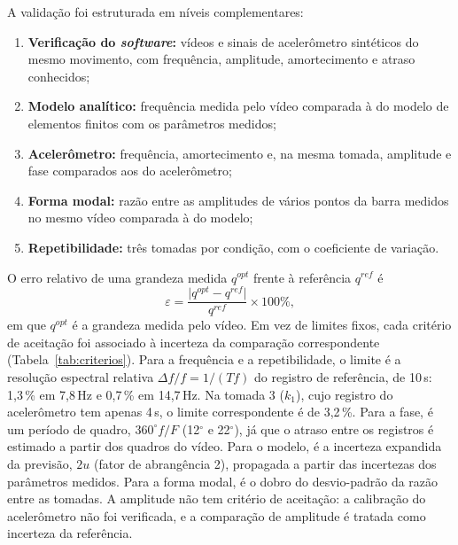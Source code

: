 \documentclass[a4paper,10pt,twocolumn]{article}
\begin{document}
A validação foi estruturada em níveis complementares:
\begin{enumerate}
    \item \textbf{Verificação do \textit{software}:} vídeos e sinais de acelerômetro sintéticos do mesmo movimento, com frequência, amplitude, amortecimento e atraso conhecidos;
    \item \textbf{Modelo analítico:} frequência medida pelo vídeo comparada à do modelo de elementos finitos com os parâmetros medidos;
    \item \textbf{Acelerômetro:} frequência, amortecimento e, na mesma tomada, amplitude e fase comparados aos do acelerômetro;
    \item \textbf{Forma modal:} razão entre as amplitudes de vários pontos da barra medidos no mesmo vídeo comparada à do modelo;
    \item \textbf{Repetibilidade:} três tomadas por condição, com o coeficiente de variação.
\end{enumerate}
O erro relativo de uma grandeza medida $q^{opt}$ frente à referência $q^{ref}$ é
\begin{equation}
    \varepsilon = \frac{\bigl|q^{opt} - q^{ref}\bigr|}{q^{ref}} \times 100\%,
    \label{eq:criterio_validacao}
\end{equation}
em que $q^{opt}$ é a grandeza medida pelo vídeo. Em vez de limites fixos, cada critério de aceitação foi associado à incerteza da comparação correspondente (Tabela~\ref{tab:criterios}). Para a frequência e a repetibilidade, o limite é a resolução espectral relativa $\Delta f/f = 1/(T f)$ do registro de referência, de 10\,s: 1,3\,\% em 7,8\,Hz e 0,7\,\% em 14,7\,Hz. Na tomada 3 ($k_1$), cujo registro do acelerômetro tem apenas 4\,s, o limite correspondente é de 3,2\,\%. Para a fase, é um período de quadro, $360^\circ f/F$ (12$^\circ$ e 22$^\circ$), já que o atraso entre os registros é estimado a partir dos quadros do vídeo. Para o modelo, é a incerteza expandida da previsão, $2u$ (fator de abrangência 2), propagada a partir das incertezas dos parâmetros medidos. Para a forma modal, é o dobro do desvio-padrão da razão entre as tomadas. A amplitude não tem critério de aceitação: a calibração do acelerômetro não foi verificada, e a comparação de amplitude é tratada como incerteza da referência.
\end{document}
